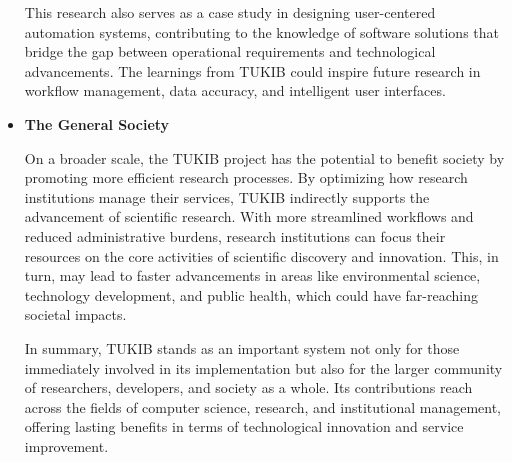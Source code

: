 \begin{itemize}
\subitem This research also serves as a case study in designing user-centered automation systems, contributing to the knowledge of software solutions that bridge the gap between operational requirements and technological advancements. The learnings from TUKIB could inspire future research in workflow management, data accuracy, and intelligent user interfaces.\newline

\item \textbf{The General Society}

\subitem On a broader scale, the TUKIB project has the potential to benefit society by promoting more efficient research processes. By optimizing how research institutions manage their services, TUKIB indirectly supports the advancement of scientific research. With more streamlined workflows and reduced administrative burdens, research institutions can focus their resources on the core activities of scientific discovery and innovation. This, in turn, may lead to faster advancements in areas like environmental science, technology development, and public health, which could have far-reaching societal impacts.\newline

\subitem In summary, TUKIB stands as an important system not only for those immediately involved in its implementation but also for the larger community of researchers, developers, and society as a whole. Its contributions reach across the fields of computer science, research, and institutional management, offering lasting benefits in terms of technological innovation and service improvement.

\end {itemize}

